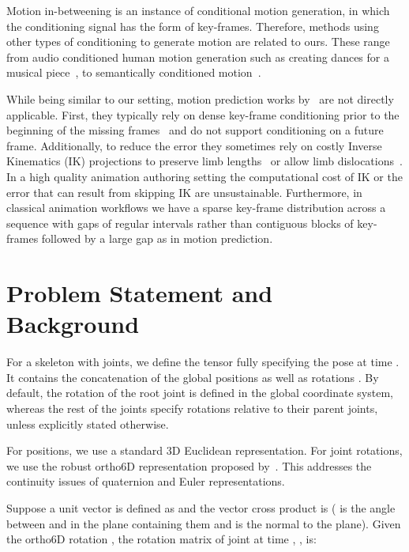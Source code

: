 \documentclass[letterpaper]{article} \usepackage[]{aaai23}  \usepackage{times}  \usepackage{helvet}  \usepackage{courier}  \usepackage[hyphens]{url}  \usepackage{graphicx} \urlstyle{rm} \def\UrlFont{\rm}  \usepackage{natbib}  \usepackage{caption} \frenchspacing  \setlength{\pdfpagewidth}{8.5in} \setlength{\pdfpageheight}{11in}
\begin{document}
Motion in-betweening is an instance of conditional motion generation, in which the conditioning signal has the form of key-frames. Therefore, methods using other types of conditioning to generate motion are related to ours. These range from audio conditioned human motion generation such as creating dances for a musical piece~\cite{kao2020temporally, li2021learn}, to semantically conditioned motion~\cite{chuan2020action2motion, petrovich2021actionconditioned}.

While being similar to our setting, motion prediction works by~\cite{martinez2017rnn, wang2022velocity} are not directly applicable. First, they typically rely on dense key-frame conditioning prior to the beginning of the missing frames~\citep{wang2022velocity} and do not support conditioning on a future frame.
Additionally, to reduce the error they sometimes rely on costly Inverse Kinematics (IK) projections to preserve limb lengths~\cite{wang2022velocity} or allow limb dislocations~\cite{kaufmann2020}. In a high quality animation authoring setting the computational cost of IK or the error that can result from skipping IK are unsustainable. Furthermore, in classical animation workflows we have a sparse key-frame distribution across a sequence with gaps of regular intervals rather than contiguous blocks of key-frames followed by a large gap as in motion prediction.




\section{Problem Statement and Background} \label{sec:problem_statement}

For a skeleton with  joints, we define the tensor  fully specifying the pose at time . It contains the concatenation of the global positions  as well as rotations . By default, the rotation of the root joint is defined in the global coordinate system, whereas the rest of the joints specify rotations relative to their parent joints, unless explicitly stated otherwise. 

For positions, we use a standard 3D Euclidean representation. For joint rotations, we use the robust ortho6D representation proposed by~\citet{zhou2019onthecontinuity}. This addresses the continuity issues of quaternion and Euler representations. 

Suppose a unit vector is defined as  and the vector cross product is  ( is the angle between  and  in the plane containing them and  is the normal to the plane). Given the ortho6D rotation , the rotation matrix of joint  at time , , is: 
\end{document}
